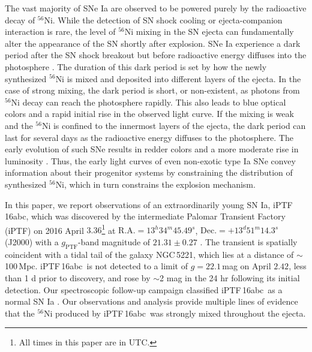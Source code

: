 \documentclass[twocolumn]{aastex61}
\newcommand{\abc}{iPTF\,16abc}
\begin{document}
The vast majority of SNe Ia are observed 
to be powered purely by the radioactive decay of $^{56}$Ni. 
While the detection of SN shock cooling or ejecta-companion interaction is rare, the level of $^{56}$Ni mixing in the SN ejecta can fundamentally alter the appearance of the SN shortly after explosion. SNe Ia experience a dark period after
the SN shock breakout but before radioactive energy  
diffuses into the photosphere \citep{2014ApJ...784...85P}. The 
duration of this dark period is set by how the newly synthesized 
$^{56}$Ni is mixed and deposited into different layers of the ejecta.
In the case of strong mixing, the dark period is short, or 
non-existent, as photons from $^{56}$Ni decay can reach the 
photosphere rapidly. This also leads to blue optical colors and a 
rapid initial rise in the observed light curve. If the mixing is 
weak and the $^{56}$Ni is confined to the innermost layers of the 
ejecta, the dark period can last for several days as the radioactive 
energy diffuses to the photosphere. The early evolution of such SNe 
results in redder colors and a more moderate rise in luminosity 
\citep{2016ApJ...826...96P}. Thus, the early light curves of even non-exotic type Ia SNe convey information about their progenitor systems by constraining the distribution of synthesized $^{56}$Ni, which in turn constrains the explosion mechanism.

In this paper, we report observations of an extraordinarily young SN
Ia, \abc, which was discovered by the intermediate Palomar
Transient Factory (iPTF) on 2016 April $3.36$\footnote{All times in this
  paper are in UTC.} at $\textrm{R.A.}=13^h34^m45.49^s$,
$\textrm{Dec.}=+13^d51^m14.3^s$ (J2000) with a $g_\mathrm{PTF}$-band magnitude of
$21.31\pm0.27$ \citep{2016ATel.8907....1M}. The
transient is spatially coincident with a tidal tail of the galaxy
NGC\,5221, which lies at a distance of $\sim$100\,Mpc. \abc\ is not detected to a limit of $g=22.1$\,mag on April $2.42$, less than 1 d prior to discovery, and rose by $\sim$2 mag in the 24 hr following its initial detection. Our spectroscopic follow-up
campaign classified \abc\ as a normal SN Ia
\citep{2016ATel.8909....1C}. Our observations and analysis provide multiple lines of evidence that the $^{56}$Ni produced by \abc\ was strongly mixed throughout the ejecta. 

\end{document}
